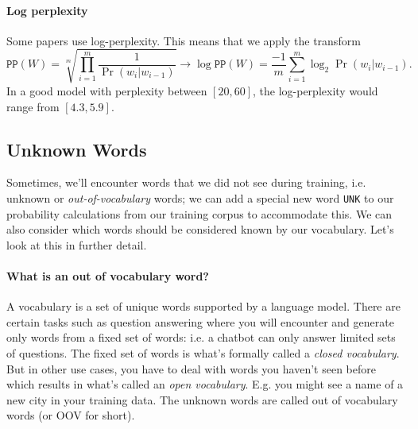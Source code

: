 \documentclass[12pt]{article}
\begin{document}
\paragraph{Log perplexity} Some papers use log-perplexity. This means that we apply the transform
\[
  \texttt{PP}(W) = \sqrt[m]{\prod_{i=1}^{m} \frac{1}{\Pr(w_i | w_{i-1})}} \longrightarrow \log \texttt{PP}(W) = \frac{-1}{m} \sum_{i=1}^{m} \log_2 \Pr(w_i | w_{i-1}).  
\]
In a good model with perplexity between $[20,60]$, the log-perplexity would range from $[4.3, 5.9]$.

\subsection{Unknown Words}
Sometimes, we'll encounter words that we did not see during training, i.e. unknown or \emph{out-of-vocabulary} words; we can add a special new word \texttt{UNK} to our probability calculations from our training corpus to accommodate this. We can also consider which words should be considered known by our vocabulary. Let's look at this in further detail.

\paragraph{What is an out of vocabulary word?} A vocabulary is a set of unique words supported by a language model. There are certain tasks such as question answering where you will encounter and generate only words from a fixed set of words: i.e. a chatbot can only answer limited sets of questions. The fixed set of words is what's formally called a \emph{closed vocabulary}. But in other use cases, you have to deal with words you haven't seen before which results in what's called an \emph{open vocabulary}. E.g. you might see a name of a new city in your training data. The unknown words are called out of vocabulary words (or OOV for short).
\end{document}
